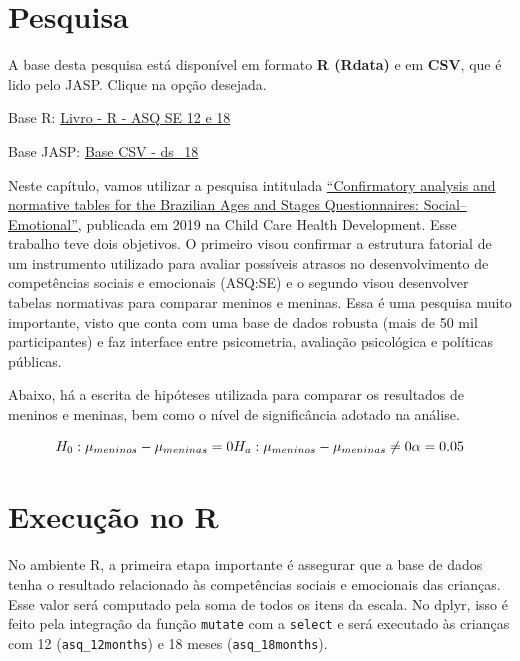 \documentclass[
]{book}
\newenvironment{base}{
  \definecolor{shadecolor}{rgb}{0.972,0.972,0.972}  %
  \color{black}
  \begin{shaded}}
 {\end{shaded}}
\begin{document}
\hypertarget{pesquisa-3}{%
\section{Pesquisa}\label{pesquisa-3}}

\begin{base}
A base desta pesquisa está disponível em formato \textbf{R (Rdata)} e em \textbf{CSV}, que é lido pelo JASP. Clique na opção desejada.

Base R: \href{https://github.com/anovabr/mqt/raw/master/bases/Livro\%20-\%20R\%20-\%20ASQ\%20SE\%2012\%20e\%2018.RData}{Livro - R - ASQ SE 12 e 18}

Base JASP: \href{https://github.com/anovabr/mqt/raw/master/bases/bases_csv_jasp.zip}{Base CSV - ds\_18}

\end{base}

Neste capítulo, vamos utilizar a pesquisa intitulada \href{https://onlinelibrary.wiley.com/doi/abs/10.1111/cch.12649}{``Confirmatory analysis and normative tables for the Brazilian Ages and Stages Questionnaires: Social--Emotional''}, publicada em 2019 na Child Care Health Development. Esse trabalho teve dois objetivos. O primeiro visou confirmar a estrutura fatorial de um instrumento utilizado para avaliar possíveis atrasos no desenvolvimento de competências sociais e emocionais (ASQ:SE) e o segundo visou desenvolver tabelas normativas para comparar meninos e meninas. Essa é uma pesquisa muito importante, visto que conta com uma base de dados robusta (mais de 50 mil participantes) e faz interface entre psicometria, avaliação psicológica e políticas públicas.

Abaixo, há a escrita de hipóteses utilizada para comparar os resultados de meninos e meninas, bem como o nível de significância adotado na análise.

\[H_0: \mu_{meninos} - \mu_{meninas} = 0 \\ H_a: \mu_{meninos} - \mu_{meninas} \neq 0 \\ \alpha = 0.05\]

\hypertarget{execuuxe7uxe3o-no-r-3}{%
\section{Execução no R}\label{execuuxe7uxe3o-no-r-3}}

No ambiente R, a primeira etapa importante é assegurar que a base de dados tenha o resultado relacionado às competências sociais e emocionais das crianças. Esse valor será computado pela soma de todos os itens da escala. No dplyr, isso é feito pela integração da função \texttt{mutate} com a \texttt{select} e será executado às crianças com 12 (\texttt{asq\_12months}) e 18 meses (\texttt{asq\_18months}).
\end{document}
